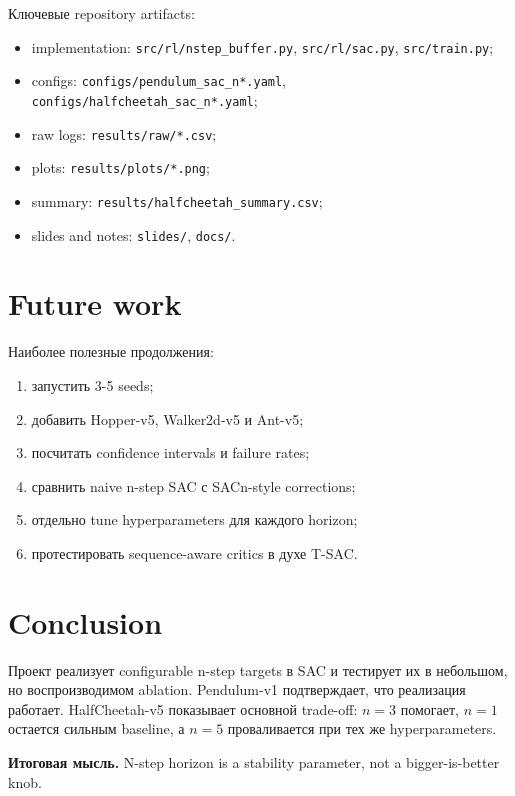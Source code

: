 \documentclass[
  russian,
]{article}
\providecommand{\tightlist}{%
  \setlength{\itemsep}{0pt}\setlength{\parskip}{0pt}}
\begin{document}
Ключевые repository artifacts:

\begin{itemize}
\tightlist
\item
  implementation: \texttt{src/rl/nstep\_buffer.py},
  \texttt{src/rl/sac.py}, \texttt{src/train.py};
\item
  configs: \texttt{configs/pendulum\_sac\_n*.yaml},
  \texttt{configs/halfcheetah\_sac\_n*.yaml};
\item
  raw logs: \texttt{results/raw/*.csv};
\item
  plots: \texttt{results/plots/*.png};
\item
  summary: \texttt{results/halfcheetah\_summary.csv};
\item
  slides and notes: \texttt{slides/}, \texttt{docs/}.
\end{itemize}

\section{Future work}\label{future-work}

Наиболее полезные продолжения:

\begin{enumerate}
\def\labelenumi{\arabic{enumi}.}
\tightlist
\item
  запустить 3-5 seeds;
\item
  добавить Hopper-v5, Walker2d-v5 и Ant-v5;
\item
  посчитать confidence intervals и failure rates;
\item
  сравнить naive n-step SAC с SACn-style corrections;
\item
  отдельно tune hyperparameters для каждого horizon;
\item
  протестировать sequence-aware critics в духе T-SAC.
\end{enumerate}

\section{Conclusion}\label{conclusion}

Проект реализует configurable n-step targets в SAC и тестирует их в
небольшом, но воспроизводимом ablation. Pendulum-v1 подтверждает, что
реализация работает. HalfCheetah-v5 показывает основной trade-off:
\(n=3\) помогает, \(n=1\) остается сильным baseline, а \(n=5\)
проваливается при тех же hyperparameters.

\begin{keybox}
\textbf{Итоговая мысль.} N-step horizon is a stability parameter, not a bigger-is-better knob.
\end{keybox}
\end{document}
